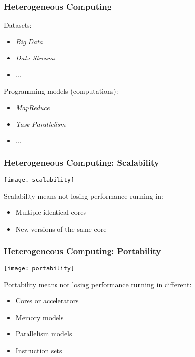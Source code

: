 \documentclass[10pt, compress]{beamer}
\begin{document}
\begin{frame}
    \frametitle{Heterogeneous Computing}
    \alert{Datasets}:
    \begin{itemize}
        \item \textit{Big Data}
        \item \textit{Data Streams}
        \item ...
    \end{itemize}
    \pause
    Programming models (\alert{computations}):
    \begin{itemize}
        \item \textit{MapReduce}
        \item \textit{Task Parallelism}
        \item ...
    \end{itemize}
\end{frame}

\begin{frame}
    \frametitle{Heterogeneous Computing: Scalability}
    \begin{center}
        \texttt{[image: scalability]}
    \end{center}

    \alert{Scalability} means not losing performance running in:
    \begin{itemize}
        \item Multiple identical cores
            \pause
        \item New versions of the same core
    \end{itemize}
\end{frame}

\begin{frame}
    \frametitle{Heterogeneous Computing: Portability}
    \begin{center}
        \texttt{[image: portability]}
    \end{center}

    \alert{Portability} means not losing performance running in different:
    \begin{itemize}
        \item Cores or \alert{accelerators}
            \pause
        \item Memory models
            \pause
        \item Parallelism models
            \pause
        \item Instruction sets
    \end{itemize}
\end{frame}
\end{document}
